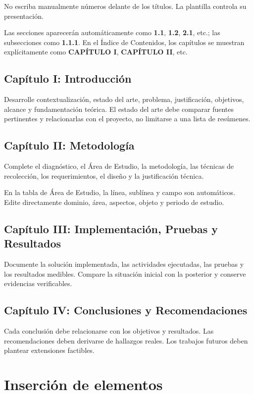 \documentclass[12pt,a4paper,oneside]{report}
\begin{document}
No escriba manualmente números delante de los títulos. La plantilla controla su presentación.

Las secciones aparecerán automáticamente como \textbf{1.1}, \textbf{1.2}, \textbf{2.1}, etc.; las subsecciones como \textbf{1.1.1}. En el Índice de Contenidos, los capítulos se muestran explícitamente como \textbf{CAPÍTULO I}, \textbf{CAPÍTULO II}, etc.

\section{Capítulo I: Introducción}

Desarrolle contextualización, estado del arte, problema, justificación, objetivos, alcance y fundamentación teórica. El estado del arte debe comparar fuentes pertinentes y relacionarlas con el proyecto, no limitarse a una lista de resúmenes.

\section{Capítulo II: Metodología}

Complete el diagnóstico, el Área de Estudio, la metodología, las técnicas de recolección, los requerimientos, el diseño y la justificación técnica.

En la tabla de Área de Estudio, la línea, sublínea y campo son automáticos. Edite directamente dominio, área, aspectos, objeto y periodo de estudio.

\section{Capítulo III: Implementación, Pruebas y Resultados}

Documente la solución implementada, las actividades ejecutadas, las pruebas y los resultados medibles. Compare la situación inicial con la posterior y conserve evidencias verificables.

\section{Capítulo IV: Conclusiones y Recomendaciones}

Cada conclusión debe relacionarse con los objetivos y resultados. Las recomendaciones deben derivarse de hallazgos reales. Los trabajos futuros deben plantear extensiones factibles.

\chapter{Inserción de elementos}
\end{document}

